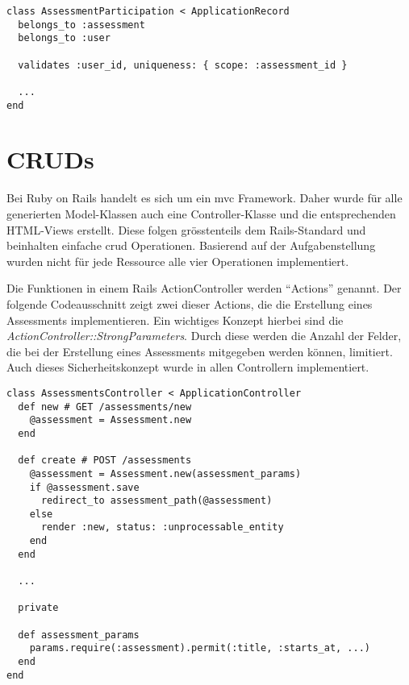 \begin{codebox}
\begin{verbatim}
class AssessmentParticipation < ApplicationRecord
  belongs_to :assessment
  belongs_to :user

  validates :user_id, uniqueness: { scope: :assessment_id }

  ...
end
\end{verbatim}
\end{codebox}

\newpage

\section{CRUDs}

Bei Ruby on Rails handelt es sich um ein \gls{mvc} Framework. Daher wurde für alle generierten Model-Klassen
auch eine Controller-Klasse und die entsprechenden HTML-Views erstellt. Diese folgen grösstenteils dem Rails-Standard \cite{default_controller_actions} und beinhalten einfache \gls{crud} Operationen.
Basierend auf der Aufgabenstellung wurden nicht für jede Ressource alle vier Operationen implementiert.

Die Funktionen in einem Rails ActionController werden \enquote{Actions} genannt. Der folgende Codeausschnitt zeigt zwei dieser Actions,
die die Erstellung eines Assessments implementieren. Ein wichtiges Konzept hierbei sind die \emph{ActionController::StrongParameters}.
Durch diese werden die Anzahl der Felder, die bei der Erstellung eines Assessments mitgegeben werden können, limitiert. Auch dieses
Sicherheitskonzept wurde in allen Controllern implementiert.

\begin{codebox}
\begin{verbatim}
class AssessmentsController < ApplicationController
  def new # GET /assessments/new
    @assessment = Assessment.new
  end

  def create # POST /assessments
    @assessment = Assessment.new(assessment_params)
    if @assessment.save
      redirect_to assessment_path(@assessment)
    else
      render :new, status: :unprocessable_entity
    end
  end

  ...

  private

  def assessment_params
    params.require(:assessment).permit(:title, :starts_at, ...)
  end
end
\end{verbatim}
\end{codebox}

